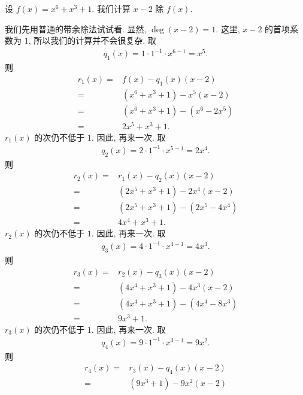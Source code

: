 \begin{example}
    设 $f(x) = x^6 + x^3 + 1$. 我们计算 $x - 2$ 除 $f(x)$.

    我们先用普通的带余除法试试看. 显然, $\deg (x-2) = 1$. 这里, $x - 2$ 的首项系数为 $1$, 所以我们的计算并不会很复杂. 取
    \begin{align*}
        q_1 (x) = 1 \cdot 1^{-1} \cdot x^{6-1} = x^5.
    \end{align*}
    则
    \begin{align*}
        r_1 (x)
        = {} & f(x) - q_1 (x) (x - 2)         \\
        = {} & (x^6 + x^3 + 1) - x^5 (x - 2)  \\
        = {} & (x^6 + x^3 + 1) - (x^6 - 2x^5) \\
        = {} & 2x^5 + x^3 + 1.
    \end{align*}
    $r_1 (x)$ 的次仍不低于 $1$. 因此, 再来一次. 取
    \begin{align*}
        q_2 (x) = 2 \cdot 1^{-1} \cdot x^{5-1} = 2x^4.
    \end{align*}
    则
    \begin{align*}
        r_2 (x)
        = {} & r_1 (x) - q_2 (x) (x - 2)        \\
        = {} & (2x^5 + x^3 + 1) - 2x^4 (x - 2)  \\
        = {} & (2x^5 + x^3 + 1) - (2x^5 - 4x^4) \\
        = {} & 4x^4 + x^3 + 1.
    \end{align*}
    $r_2 (x)$ 的次仍不低于 $1$. 因此, 再来一次. 取
    \begin{align*}
        q_3 (x) = 4 \cdot 1^{-1} \cdot x^{4-1} = 4x^3.
    \end{align*}
    则
    \begin{align*}
        r_3 (x)
        = {} & r_2 (x) - q_3 (x) (x - 2)        \\
        = {} & (4x^4 + x^3 + 1) - 4x^3 (x - 2)  \\
        = {} & (4x^4 + x^3 + 1) - (4x^4 - 8x^3) \\
        = {} & 9x^3 + 1.
    \end{align*}
    $r_3 (x)$ 的次仍不低于 $1$. 因此, 再来一次. 取
    \begin{align*}
        q_4 (x) = 9 \cdot 1^{-1} \cdot x^{3-1} = 9x^2.
    \end{align*}
    则
    \begin{align*}
        r_4 (x)
        = {} & r_3 (x) - q_4 (x) (x - 2)   \\
        = {} & (9x^3 + 1) - 9x^2 (x - 2)   \\

\end{align*}
\end{example}
